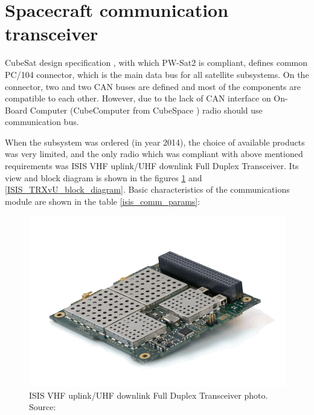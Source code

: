 
\section{Spacecraft communication transceiver}
\label{section:comm_design}
CubeSat design specification \cite{cubesat_spec}, with which PW-Sat2 is compliant, defines common PC/104 connector, which is the main data bus for all satellite subsystems. On the connector, two \iic and two CAN buses are defined and most of the components are compatible to each other. However, due to the lack of CAN interface on On-Board Computer (CubeComputer from CubeSpace \cite{cubespace_website}) radio should use \iic communication bus.

When the subsystem was ordered (in year \si{2014}), the choice of available products was very limited, and the only radio which was compliant with above mentioned requirements was ISIS VHF uplink/UHF downlink Full Duplex Transceiver. Its view and block diagram is shown in the figures \ref{ISIS_TRXvU_photo} and \ref{ISIS_TRXvU_block_diagram}. Basic characteristics of the communications module are shown in the table \ref{isis_comm_params}:

\begin{figure}[H]
    \centering
    \includegraphics[width=0.7\paperwidth]{img/6/ISIS-radio-UHF-VHF-min.png}
    \caption{ISIS VHF uplink/UHF downlink Full Duplex Transceiver photo. Source: \cite{isis_trxvu}}
    \label{ISIS_TRXvU_photo}
\end{figure}

